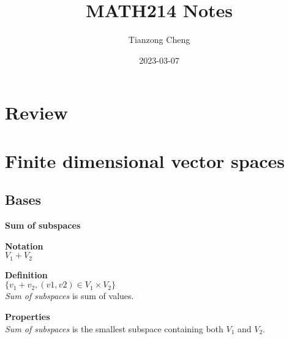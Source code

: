 \documentclass{article}
\title{MATH214 Notes}
\author{Tianzong Cheng}
\date{2023-03-07}
\begin{document}
\maketitle

\section{Review}

\section{Finite dimensional vector spaces}

\subsection{Bases}

\begin{framed}

\noindent \textbf{Sum of subspaces}

\begin{framed}
    \noindent \textbf{Notation}\\
$V_{1}+V_{2}$
\end{framed}

\begin{framed}
    \noindent \textbf{Definition}\\
$\{v_{1}+v_{2},(v1,v2)\in V_{1}\times V_{2}\}$\\
\textit{Sum of subspaces} is sum of values.
\end{framed}

\begin{framed}
\noindent \textbf{Properties}\\
\textit{Sum of subspaces} is the smallest subspace containing both $V_{1}$ and $V_{2}$.
\end{framed}

\end{framed}
\end{document}
